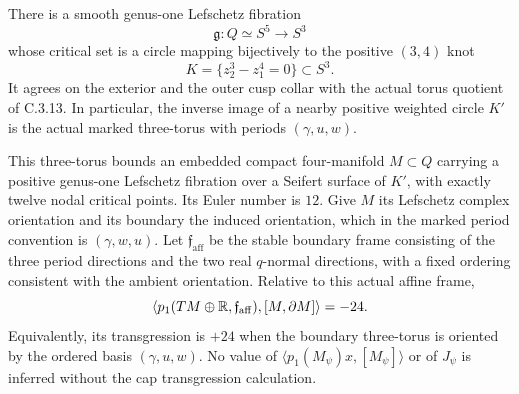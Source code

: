 \begin{proposition}
There is a smooth genus-one Lefschetz fibration
\[
 \mathfrak g:Q\simeq S^5\longrightarrow S^3
\]
whose critical set is a circle mapping bijectively to the positive
$(3,4)$ knot
\[
 K=\{z_2^3-z_1^4=0\}\subset S^3.
\]
It agrees on the exterior and the outer cusp collar with the
actual torus quotient of C.3.13. In particular, the inverse image
of a nearby positive weighted circle $K'$ is the actual marked
three-torus with periods $(\gamma,u,w)$.

This three-torus bounds an embedded compact four-manifold
$M\subset Q$ carrying a positive genus-one Lefschetz fibration
over a Seifert surface of $K'$, with exactly twelve nodal critical
points. Its Euler number is $12$. Give $M$ its Lefschetz complex
orientation and its boundary the induced orientation, which in
the marked period convention is $(\gamma,w,u)$. Let
$\mathfrak f_{\mathrm{aff}}$ be the stable boundary frame consisting
of the three period directions and the two real $q$-normal
directions, with a fixed ordering consistent with the ambient
orientation. Relative to this actual affine frame,
\[
 \left\langle p_1(TM\oplus\mathbb R,\mathfrak f_{\mathrm{aff}}),
                   [M,\partial M]\right\rangle=-24.
\]
Equivalently, its transgression is $+24$ when the boundary
three-torus is oriented by the ordered basis $(\gamma,u,w)$.
No value of $\langle p_1(M_\psi)x,[M_\psi]\rangle$ or of
$J_\psi$ is inferred without the cap transgression calculation.
\end{proposition}
